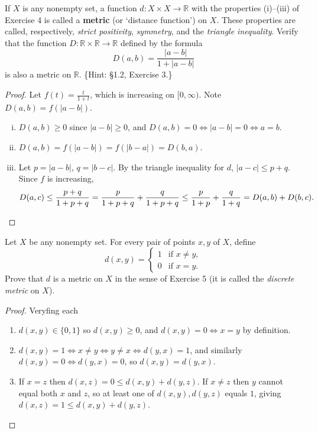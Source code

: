 \begin{tcolorbox}[title=Problem 5, breakable]
If $X$ is any nonempty set, a function $d : X \times X \to \mathbb{R}$ with the properties (i)--(iii) of Exercise 4 is called a \textbf{metric} (or `distance function') on $X$. These properties are called, respectively, \textit{strict positivity}, \textit{symmetry}, and the \textit{triangle inequality}. Verify that the function $D : \mathbb{R} \times \mathbb{R} \to \mathbb{R}$ defined by the formula
\[
    D(a,b) = \frac{|a-b|}{1 + |a-b|}
\]
is also a metric on $\mathbb{R}$. \{Hint: \S1.2, Exercise 3.\}
\end{tcolorbox}

\begin{proof}
    Let $f(t) = \frac{t}{1+t}$, which is increasing on $[0,\infty)$. Note $D(a,b) = f(|a-b|)$.
    \begin{enumerate}[(i)]
        \item $D(a,b) \geq 0$ since $|a-b| \geq 0$, and $D(a,b) = 0 \Leftrightarrow |a-b| = 0 \Leftrightarrow a = b$.
        \item $D(a,b) = f(|a-b|) = f(|b-a|) = D(b,a)$.
        \item Let $p = |a-b|$, $q = |b-c|$. By the triangle inequality for $d$, $|a-c| \leq p + q$. Since $f$ is increasing,
        \[D(a,c) \leq \frac{p+q}{1+p+q} = \frac{p}{1+p+q} + \frac{q}{1+p+q} \leq \frac{p}{1+p} + \frac{q}{1+q} = D(a,b) + D(b,c). \qedhere\]
    \end{enumerate}
\end{proof}

\begin{tcolorbox}[title=Problem 6, breakable]
Let $X$ be any nonempty set. For every pair of points $x, y$ of $X$, define
\[
    d(x,y) = \begin{cases} 1 & \text{if } x \neq y, \\ 0 & \text{if } x = y. \end{cases}
\]
Prove that $d$ is a metric on $X$ in the sense of Exercise 5 (it is called the \textit{discrete metric} on $X$).
\end{tcolorbox}

\begin{proof}
    Veryfing each
    \begin{enumerate}
        \item $d(x,y) \in \{0,1\}$ so $d(x,y) \geq 0$, and $d(x,y) = 0 \Leftrightarrow x = y$ by definition.
        \item $d(x,y) = 1 \Leftrightarrow x \neq y \Leftrightarrow y \neq x \Leftrightarrow d(y,x) = 1$, and similarly $d(x,y) = 0 \Leftrightarrow d(y,x) = 0$, so $d(x,y) = d(y,x)$.
        \item If $x = z$ then $d(x,z) = 0 \leq d(x,y) + d(y,z)$. If $x \neq z$ then $y$ cannot equal both $x$ and $z$, so at least one of $d(x,y), d(y,z)$ equals $1$, giving $d(x,z) = 1 \leq d(x,y) + d(y,z)$. \qedhere
    \end{enumerate}
\end{proof}

